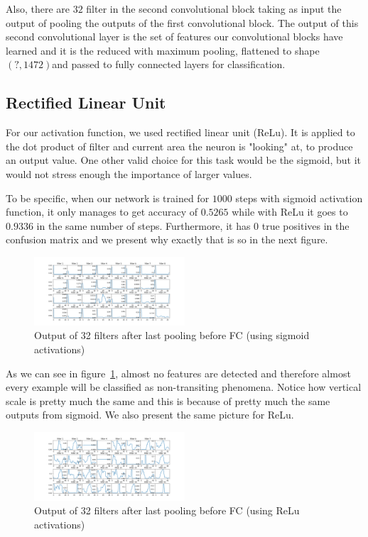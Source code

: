 \documentclass[twoside]{article}
\begin{document}
\begin{multicols}{2}
Also, there are $32$ filter in the second convolutional block taking as input the output of pooling the outputs of the first convolutional block. The output of this second convolutional layer is the set of features our convolutional blocks have learned and it is the reduced with maximum pooling, flattened to shape $(?,1472) $and passed to fully connected layers for classification.

\subsection{Rectified Linear Unit}
For our activation function, we used rectified linear unit (ReLu). It is applied to the dot product of filter and current area the neuron is "looking" at, to produce an output value. One other valid choice for this task would be the sigmoid, but it would not stress enough the importance of larger values.

To be specific, when our network is trained for $1000$ steps with sigmoid activation function, it only manages to get accuracy of $0.5265$ while with ReLu it goes to $0.9336$ in the same number of steps. Furthermore, it has $0$ true positives in the confusion matrix and we present why exactly that is so in the next figure.
\begin{figure}[H]
\includegraphics[width=0.5\textwidth]{sigmoid_pooling2}
\caption{Output of 32 filters after last pooling before FC (using sigmoid activations)}
\label{fig:sigmoid-pool2}
\end{figure}

As we can see in figure~\ref{fig:sigmoid-pool2}, almost no features are detected and therefore almost every example will be classified as non-transiting phenomena. Notice how vertical scale is pretty much the same and this is because of pretty much the same outputs from sigmoid. We also present the same picture for ReLu.
\begin{figure}[H]
\includegraphics[width=0.5\textwidth]{relu_pooling2}
\caption{Output of 32 filters after last pooling before FC (using ReLu activations)}
\label{fig:relu-pool2}
\end{figure}


\end{multicols}
\end{document}
